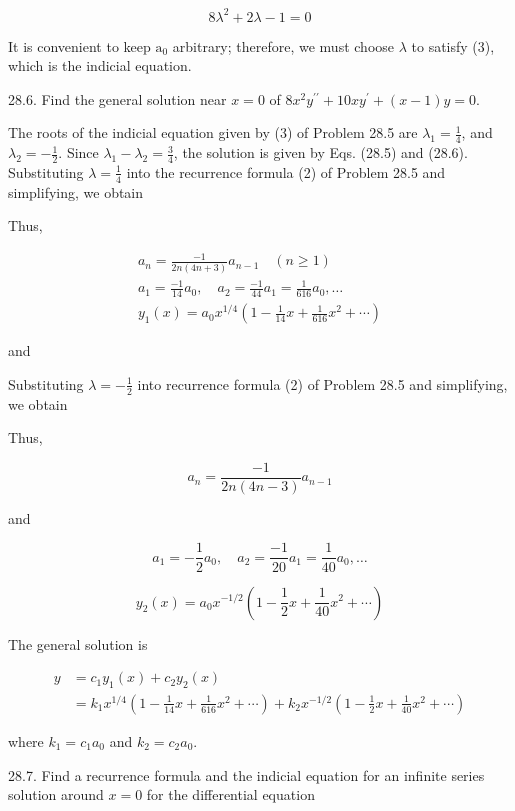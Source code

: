 \documentclass[10pt]{article}
\begin{document}
\begin{equation*}
8 \lambda^{2}+2 \lambda-1=0 \tag{3}
\end{equation*}


It is convenient to keep $\mathrm{a}_{0}$ arbitrary; therefore, we must choose $\lambda$ to satisfy (3), which is the indicial equation.

28.6. Find the general solution near $x=0$ of $8 x^{2} y^{\prime \prime}+10 x y^{\prime}+(x-1) y=0$.

The roots of the indicial equation given by (3) of Problem 28.5 are $\lambda_{1}=\frac{1}{4}$, and $\lambda_{2}=-\frac{1}{2}$. Since $\lambda_{1}-\lambda_{2}=\frac{3}{4}$, the solution is given by Eqs. (28.5) and (28.6). Substituting $\lambda=\frac{1}{4}$ into the recurrence formula (2) of Problem 28.5 and simplifying, we obtain

Thus,

$$
\begin{gathered}
a_{n}=\frac{-1}{2 n(4 n+3)} a_{n-1} \quad(n \geq 1) \\
a_{1}=\frac{-1}{14} a_{0}, \quad a_{2}=\frac{-1}{44} a_{1}=\frac{1}{616} a_{0}, \ldots \\
y_{1}(x)=a_{0} x^{1 / 4}\left(1-\frac{1}{14} x+\frac{1}{616} x^{2}+\cdots\right)
\end{gathered}
$$

and

Substituting $\lambda=-\frac{1}{2}$ into recurrence formula (2) of Problem 28.5 and simplifying, we obtain

Thus,

$$
a_{n}=\frac{-1}{2 n(4 n-3)} a_{n-1}
$$

and

$$
a_{1}=-\frac{1}{2} a_{0}, \quad a_{2}=\frac{-1}{20} a_{1}=\frac{1}{40} a_{0}, \ldots
$$

$$
y_{2}(x)=a_{0} x^{-1 / 2}\left(1-\frac{1}{2} x+\frac{1}{40} x^{2}+\cdots\right)
$$

The general solution is

$$
\begin{aligned}
y & =c_{1} y_{1}(x)+c_{2} y_{2}(x) \\
& =k_{1} x^{1 / 4}\left(1-\frac{1}{14} x+\frac{1}{616} x^{2}+\cdots\right)+k_{2} x^{-1 / 2}\left(1-\frac{1}{2} x+\frac{1}{40} x^{2}+\cdots\right)
\end{aligned}
$$

where $k_{1}=c_{1} a_{0}$ and $k_{2}=c_{2} a_{0}$.

28.7. Find a recurrence formula and the indicial equation for an infinite series solution around $x=0$ for the differential equation
\end{document}
